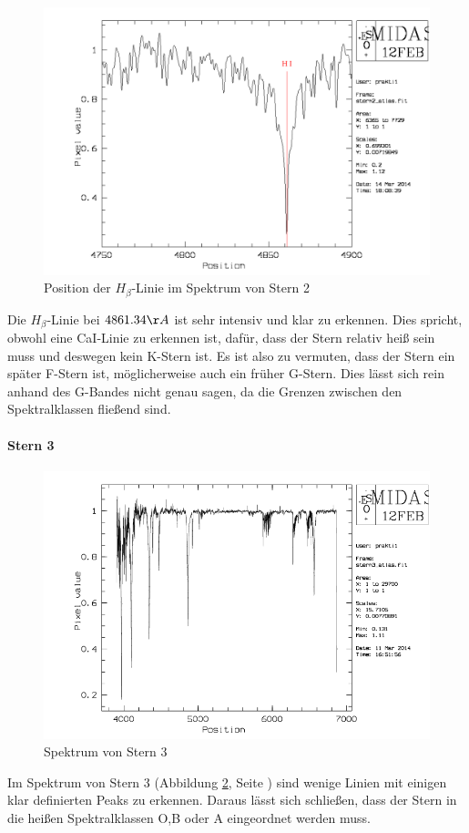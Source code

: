 \\
\begin{figure}
\includegraphics[height=.4\textheight]{images/stern2_H_beta.png}
\caption{Position der $H_\beta$-Linie im Spektrum von Stern 2}
\label{fig:stern2_H_beta}
\end{figure}
Die $H_\beta$-Linie bei $4861.34 \AA$ ist sehr intensiv und klar zu erkennen. Dies spricht, obwohl eine CaI-Linie zu erkennen ist, dafür, dass der Stern relativ heiß sein muss und deswegen kein K-Stern ist. Es ist also zu vermuten, dass der Stern ein später F-Stern ist, möglicherweise auch ein früher G-Stern. Dies lässt sich rein anhand des G-Bandes nicht genau sagen, da die Grenzen zwischen den Spektralklassen fließend sind.

\paragraph{Stern 3}
\begin{figure}
\includegraphics[height=.4\textheight]{images/stern3_spektrum.png}
\caption{Spektrum von Stern 3}
\label{fig:stern3_spektrum}
\end{figure}
Im Spektrum von Stern 3 (Abbildung \ref{fig:stern3_spektrum}, Seite \pageref{fig:stern3_spektrum}) sind wenige Linien mit einigen klar definierten Peaks zu erkennen. Daraus lässt sich schließen, dass der Stern in die heißen Spektralklassen O,B oder A  eingeordnet werden muss.

